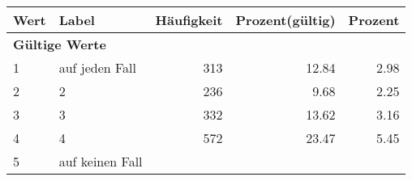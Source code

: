      \begin{longtable}{lXrrr}
     \toprule
     \textbf{Wert} & \textbf{Label} & \textbf{Häufigkeit} & \textbf{Prozent(gültig)} & \textbf{Prozent} \\
     \endhead
     \midrule
     \multicolumn{5}{l}{\textbf{Gültige Werte}}\\

     1 &
     \multicolumn{1}{X}{ auf jeden Fall   } &


       \num{313} &
       \num[round-mode=places,round-precision=2]{12.84} &
         \num[round-mode=places,round-precision=2]{2.98} \\

     2 &
     \multicolumn{1}{X}{ 2   } &


       \num{236} &
       \num[round-mode=places,round-precision=2]{9.68} &
         \num[round-mode=places,round-precision=2]{2.25} \\

     3 &
     \multicolumn{1}{X}{ 3   } &


       \num{332} &
       \num[round-mode=places,round-precision=2]{13.62} &
         \num[round-mode=places,round-precision=2]{3.16} \\

     4 &
     \multicolumn{1}{X}{ 4   } &


       \num{572} &
       \num[round-mode=places,round-precision=2]{23.47} &
         \num[round-mode=places,round-precision=2]{5.45} \\

     5 &
     \multicolumn{1}{X}{ auf keinen Fall   } &



\end{longtable}
